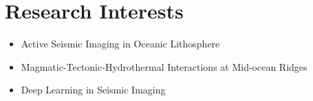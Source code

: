\section{Research Interests}

\begin{itemize}
\item Active Seismic Imaging in Oceanic Lithosphere
\item Magmatic-Tectonic-Hydrothermal Interactions at Mid-ocean Ridges
\item Deep Learning in Seismic Imaging
\end{itemize}
